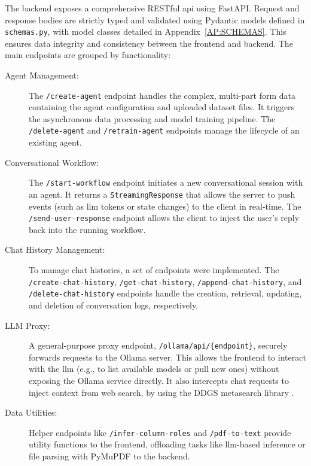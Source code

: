 The backend exposes a comprehensive RESTful \acs{api} using FastAPI. Request and response bodies are strictly typed and validated using Pydantic models defined in \texttt{schemas.py}, with model classes detailed in Appendix~\ref{AP:SCHEMAS}. This ensures data integrity and consistency between the frontend and backend. The main endpoints are grouped by functionality:

\begin{description}
    \item[Agent Management:] The \texttt{/create-agent} endpoint handles the complex, multi-part form data containing the agent configuration and uploaded dataset files. It triggers the asynchronous data processing and model training pipeline. The \texttt{/delete-agent} and \texttt{/retrain-agent} endpoints manage the lifecycle of an existing agent.

    \item[Conversational Workflow:] The \texttt{/start-workflow} endpoint initiates a new conversational session with an agent. It returns a \texttt{StreamingResponse} that allows the server to push events (such as \ac{llm} tokens or state changes) to the client in real-time. The \texttt{/send-user-response} endpoint allows the client to inject the user's reply back into the running workflow.

    \item[Chat History Management:] To manage chat histories, a set of endpoints were implemented. The \texttt{/create-chat-history}, \texttt{/get-chat-history}, \texttt{/append-chat-history}, and \\ \texttt{/delete-chat-history} endpoints handle the creation, retrieval, updating, and deletion of conversation logs, respectively.

    \item[LLM Proxy:] A general-purpose proxy endpoint, \texttt{/ollama/api/\{endpoint\}}, securely forwards requests to the Ollama server. This allows the frontend to interact with the \ac{llm} (e.g., to list available models or pull new ones) without exposing the Ollama service directly. It also intercepts chat requests to inject context from web search, by using the DDGS metasearch library \cite{DDGS-SEARCH}.

    \item[Data Utilities:] Helper endpoints like \texttt{/infer-column-roles} and \texttt{/pdf-to-text} provide utility functions to the frontend, offloading tasks like \ac{llm}-based inference or file parsing with PyMuPDF \cite{PYMUPDF} to the backend.
\end{description}
